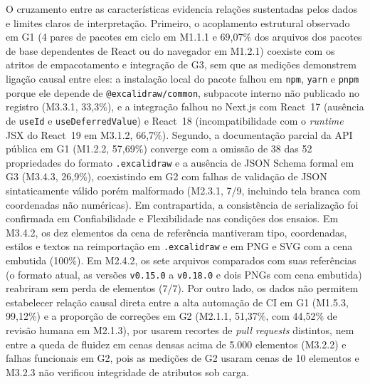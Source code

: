 \documentclass[12pt]{article}
\begin{document}
O cruzamento entre as características evidencia relações sustentadas pelos dados e limites claros de interpretação. Primeiro, o acoplamento estrutural observado em G1 (4 pares de pacotes em ciclo em M1.1.1 e 69,07\% dos arquivos dos pacotes de base dependentes de React ou do navegador em M1.2.1) coexiste com os atritos de empacotamento e integração de G3, sem que as medições demonstrem ligação causal entre eles: a instalação local do pacote falhou em \texttt{npm}, \texttt{yarn} e \texttt{pnpm} porque ele depende de \texttt{@excalidraw/common}, subpacote interno não publicado no registro (M3.3.1, 33,3\%), e a integração falhou no Next.js com React~17 (ausência de \texttt{useId} e \texttt{useDeferredValue}) e React~18 (incompatibilidade com o \textit{runtime} JSX do React~19 em M3.1.2, 66,7\%). Segundo, a documentação parcial da API pública em G1 (M1.2.2, 57,69\%) converge com a omissão de 38 das 52 propriedades do formato \texttt{.excalidraw} e a ausência de JSON Schema formal em G3 (M3.4.3, 26,9\%), coexistindo em G2 com falhas de validação de JSON sintaticamente válido porém malformado (M2.3.1, 7/9, incluindo tela branca com coordenadas não numéricas). Em contrapartida, a consistência de serialização foi confirmada em Confiabilidade e Flexibilidade nas condições dos ensaios. Em M3.4.2, os dez elementos da cena de referência mantiveram tipo, coordenadas, estilos e textos na reimportação em \texttt{.excalidraw} e em PNG e SVG com a cena embutida (100\%). Em M2.4.2, os sete arquivos comparados com suas referências (o formato atual, as versões \texttt{v0.15.0} a \texttt{v0.18.0} e dois PNGs com cena embutida) reabriram sem perda de elementos (7/7). Por outro lado, os dados não permitem estabelecer relação causal direta entre a alta automação de CI em G1 (M1.5.3, 99,12\%) e a proporção de correções em G2 (M2.1.1, 51,37\%, com 44,52\% de revisão humana em M2.1.3), por usarem recortes de \textit{pull requests} distintos, nem entre a queda de fluidez em cenas densas acima de 5.000 elementos (M3.2.2) e falhas funcionais em G2, pois as medições de G2 usaram cenas de 10 elementos e M3.2.3 não verificou integridade de atributos sob carga.
\end{document}
